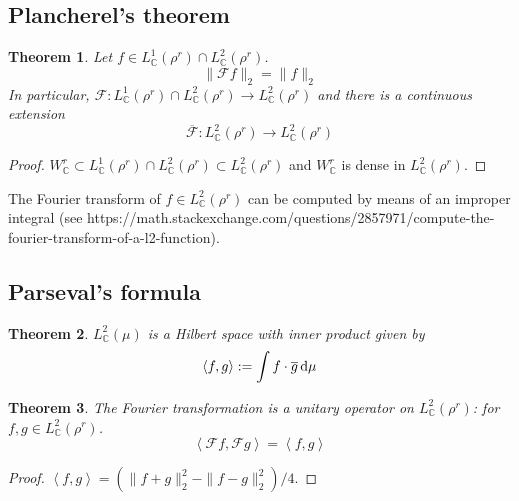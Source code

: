 \documentclass[11pt, a4paper, openany]{book}
\newtheorem{thm}{Theorem}\newtheorem{lem}{Lemma}\newtheorem{crl}{Corollary}
\theoremstyle{definition}
\begin{document}
\subsection{Plancherel's theorem}
    \begin{thm}
        Let $f\in L^1_{\mathbb{C}}(\rho^r)\cap L^2_\mathbb{C}(\rho^r)$.
        \[\|\mathcal{F}f\|_2=\|f\|_2\]
        In particular, $\mathcal{F}:L^1_{\mathbb{C}}(\rho^r)\cap L^2_\mathbb{C}(\rho^r)\rightarrow L^2_\mathbb{C}(\rho^r)$ and there is a continuous extension \[\overline{\mathcal{F}}:L^2_{\mathbb{C}}(\rho^r)\rightarrow L^2_{\mathbb{C}}(\rho^r)\]
    \end{thm}
    \begin{proof}
        $W^r_\mathbb{C}\subset L^1_{\mathbb{C}}(\rho^r)\cap L^2_\mathbb{C}(\rho^r) \subset L^2_\mathbb{C}(\rho^r)$ and $W^r_\mathbb{C}$ is dense in $L^2_\mathbb{C}(\rho^r)$.
    \end{proof}
    The Fourier transform of $f\in L^2_\mathbb{C}(\rho^r)$ can be computed by means of an improper integral (see https://math.stackexchange.com/questions/2857971/compute-the-fourier-transform-of-a-l2-function).
\subsection{Parseval's formula}
    \begin{thm}
        $L^2_\mathbb{C}(\mu)$ is a Hilbert space with inner product given by
        \[
            \left<f,g\right>:=\int f\cdot \overline{g}\odif\mu
        \]
    \end{thm}
    \begin{thm}
        The Fourier transformation is a unitary operator on $L^2_\mathbb{C}(\rho^r)$: for $f,g\in L^2_\mathbb{C}(\rho^r)%
        $.
        \[
            \left<\mathcal{F}f,\mathcal{F}g\right>=\left<f,g\right>
        \]
    \end{thm}
    \begin{proof}
        $\left<f,g\right>%
        =(\|f+g\|_2^2-\|f-g\|_2^2)/4$.
    \end{proof}
\end{document}
